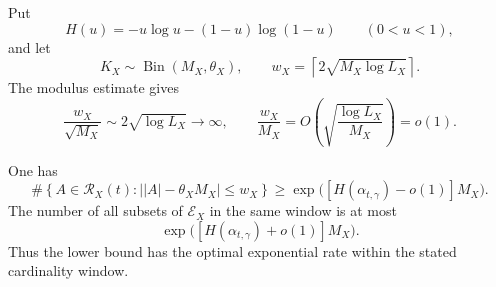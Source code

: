 Put
\[
 H(u)=-u\log u-(1-u)\log(1-u)
 \qquad(0<u<1),
\]
and let
\[
 K_X\sim\operatorname{Bin}(M_X,\theta_X),
 \qquad
 w_X=\left\lceil2\sqrt{M_X\log L_X}\right\rceil.
\]
The modulus estimate gives
\begin{equation}
\label{eq:wX-scales}
 \frac{w_X}{\sqrt{M_X}}\sim2\sqrt{\log L_X}\longrightarrow\infty,
 \qquad
 \frac{w_X}{M_X}
 =O\!\left(\sqrt{\frac{\log L_X}{M_X}}\right)=o(1).
\end{equation}

\begin{theorem}
\label{thm:mesoscopic-entropy}
One has
\begin{equation}
\label{eq:mesoscopic-entropy-lower}
 \#\left\{A\in\mathcal R_X(t):
 \bigl||A|-\theta_XM_X\bigr|\leq w_X\right\}
 \geq\exp\bigl([H(\alpha_{t,\gamma})-o(1)]M_X\bigr).
\end{equation}
The number of all subsets of $\mathcal E_X$ in the same window is at most
\begin{equation}
\label{eq:mesoscopic-entropy-upper}
 \exp\bigl([H(\alpha_{t,\gamma})+o(1)]M_X\bigr).
\end{equation}
Thus the lower bound has the optimal exponential rate within the stated cardinality window.
\end{theorem}

